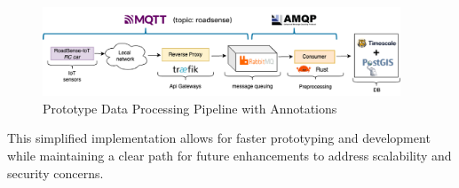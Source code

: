 \begin{figure}[H]
	\begin{center}
		\includegraphics[width=0.95\textwidth]{../../assets/diagrams/prototype_pipeline/prototype_pipeline_annotated.png}
	\end{center}
	\caption{Prototype Data Processing Pipeline with Annotations}
	\label{fig:annotated_prototype_pipeline}
\end{figure}

\noindent This simplified implementation allows for faster prototyping and development while maintaining a clear path for future enhancements to address scalability and security concerns.

